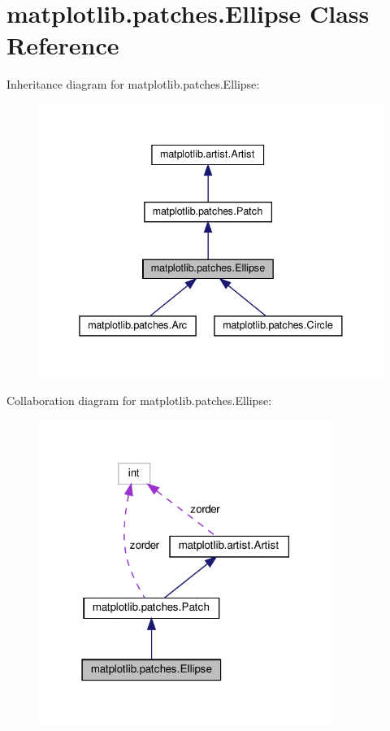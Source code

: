 \hypertarget{classmatplotlib_1_1patches_1_1Ellipse}{}\section{matplotlib.\+patches.\+Ellipse Class Reference}
\label{classmatplotlib_1_1patches_1_1Ellipse}


Inheritance diagram for matplotlib.\+patches.\+Ellipse\+:
\nopagebreak
\begin{figure}[H]
\begin{center}
\leavevmode
\includegraphics[width=338pt]{classmatplotlib_1_1patches_1_1Ellipse__inherit__graph}
\end{center}
\end{figure}


Collaboration diagram for matplotlib.\+patches.\+Ellipse\+:
\nopagebreak
\begin{figure}[H]
\begin{center}
\leavevmode
\includegraphics[width=271pt]{classmatplotlib_1_1patches_1_1Ellipse__coll__graph}
\end{center}
\end{figure}
